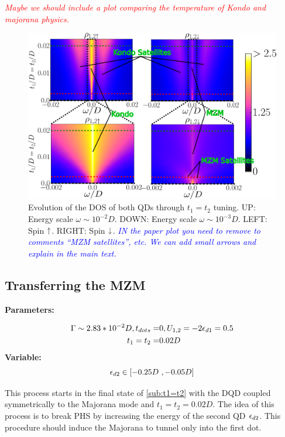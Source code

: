 \documentclass[showpacs,aps,prb,reprint,superscriptaddress]{revtex4-1}
\newcommand{\LUIS}[1]{\textcolor{blue}{\fbox{Luis} {\sl#1}}}
\newcommand{\Jesus}[1]{\textcolor{red}{\fbox{Jesus} {\sl#1}}}
\begin{document}
    \Jesus{Maybe we should include a plot comparing the temperature of Kondo and majorana physics.}

    \begin{figure}[bt]
        \begin{center}
            \includegraphics[scale=0.26]{Graficos/t1=t2-2D.png}
            \caption{\label{fig:t1=t2-2D}Evolution of the DOS of both QDs through $t_1 = t_2$ tuning. UP: Energy scale $\omega \sim 10^{-2}D$. DOWN: Energy scale $\omega \sim 10^{-3}D$. LEFT: Spin $\uparrow$. RIGHT: Spin $\downarrow$. \LUIS{IN the paper plot you need to remove to comments ``MZM satellites'', etc. We can add small arrows and explain in the main text.}}
            \end{center}
    \end{figure}
    
\subsection{Transferring the MZM \label{sec:e2}}

\textbf{Parameters:}

\begin{align*}
    \Gamma \sim 2.83*10^{-2}D, t_{dots}= & 0 , U_{1,2} = -2\epsilon_{d1} = 0.5 \\
    t_1=t_2=&0.02D
\end{align*}
\textbf{Variable:}
$$\epsilon_{d2} \in [-0.25D \  , -0.05D]$$

This process starts in the final state of \ref{sub:t1=t2} with the DQD coupled symmetrically to the Majorana mode and $t_1=t_2=0.02D$. The idea of this process is to break PHS by increasing the energy of the second QD $\epsilon_{d2}$. This procedure should induce the Majorana to tunnel only into the first dot. \\
\end{document}
